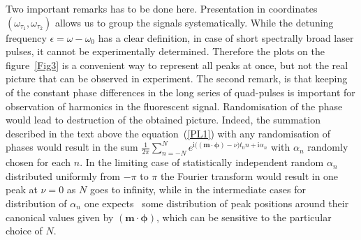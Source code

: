 \documentclass[prb,twocolumn,showpacs,epsfig,epsf]{revtex4}
\renewcommand{\i}{\mathrm{i}}
\newcommand{\1}{\mathds{1}}
\begin{document}
Two important remarks has to be done here. Presentation in coordinates $(\omega_{\tau_1},\omega_{\tau_2})$ allows us to group the signals systematically. While the detuning frequency $\epsilon=\omega-\omega_0$ has a clear definition, in case of short spectrally broad laser pulses, it cannot be experimentally determined. %
Therefore the plots on the figure~\ref{Fig3} is a convenient way to represent all peaks at once, but not the real picture that can be observed in experiment. The second remark, is that keeping of the constant phase differences in the long series of quad-pulses is important for observation of harmonics in the fluorescent signal. Randomisation of the phase would lead to destruction of the obtained picture. Indeed, the summation described in the text above the equation~(\ref{PL1}) with any randomisation of phases would result in the sum $\frac{1}{2\pi}\sum_{n=-N}^N e^{\i \big((\boldsymbol m\cdot\boldsymbol \phi)-\nu\big)t_0 n+\i \alpha_n}$ with $\alpha_n$ randomly chosen for each $n$. In the limiting case of statistically independent random $\alpha_n$ distributed uniformly from $-\pi$ to $\pi$ the Fourier transform would result in one peak at $\nu=0$ as $N$ goes to infinity, while in the intermediate cases for distribution of $\alpha_n$ one expects~\cite{AHN2002} some distribution of peak positions around their canonical values given by $(\boldsymbol m\cdot\boldsymbol \phi)$, which can be sensitive to the particular choice of $N$. 
\end{document}
